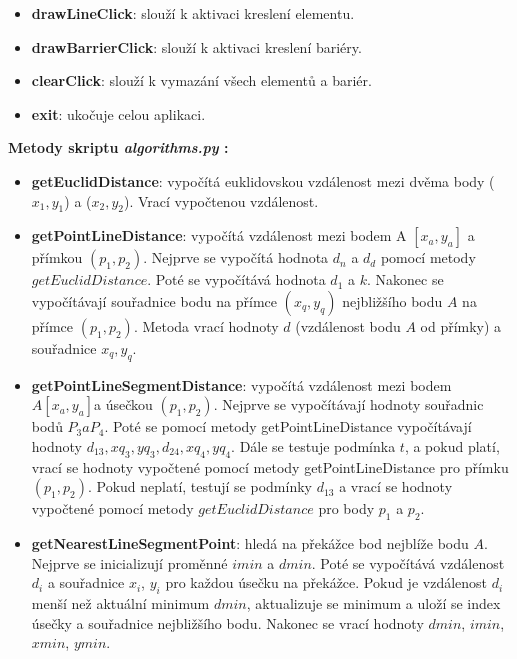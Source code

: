 \documentclass[a4paper,12pt]{article}
\begin{document}
{{{{{{\begin{itemize}
        \item \textbf{drawLineClick}: slouží k aktivaci kreslení elementu.

        \item \textbf{drawBarrierClick}: slouží k aktivaci kreslení bariéry.

        \item \textbf{clearClick}: slouží k vymazání všech elementů a bariér.

        \item \textbf{exit}: ukočuje celou aplikaci.
        
    \end{itemize}

    \textbf{Metody skriptu \emph{algorithms.py} :}
    \begin{itemize}
        \item \textbf{getEuclidDistance}: vypočítá euklidovskou vzdálenost mezi dvěma body ($x_1, y_1$) a ($x_2, y_2$). Vrací vypočtenou vzdálenost.

        \item \textbf{getPointLineDistance}: vypočítá vzdálenost mezi bodem A $[x_a, y_a]$ a přímkou $(p_1, p_2)$. Nejprve se vypočítá hodnota $d_n$ a $d_d$ pomocí metody $getEuclidDistance$. Poté se vypočítává hodnota $d_1$ a $k$. Nakonec se vypočítávají souřadnice bodu na přímce $(x_q, y_q)$ nejbližšího bodu $A$ na přímce $(p_1, p_2)$. Metoda vrací hodnoty $d$ (vzdálenost bodu $A$ od přímky) a souřadnice $x_q, y_q$.

        \item \textbf{getPointLineSegmentDistance}: vypočítá vzdálenost mezi bodem $A [x_a, y_a]$a úsečkou $(p_1, p_2)$. Nejprve se vypočítávají hodnoty souřadnic bodů $P_3 a P_4$. Poté se pomocí metody getPointLineDistance vypočítávají hodnoty $d_13, xq_3, yq_3, d_24, xq_4, yq_4$. Dále se testuje podmínka $t$, a pokud platí, vrací se hodnoty vypočtené pomocí metody getPointLineDistance pro přímku $(p_1, p_2)$. Pokud neplatí, testují se podmínky $d_13$ a vrací se hodnoty vypočtené pomocí metody $getEuclidDistance$ pro body $p_1$ a $p_2$.
        
        \item \textbf{getNearestLineSegmentPoint}: hledá na překážce bod nejblíže bodu $A$. Nejprve se inicializují proměnné $imin$ a $dmin$. Poté se vypočítává vzdálenost $d_i$ a souřadnice $x_i$, $y_i$ pro každou úsečku na překážce. Pokud je vzdálenost $d_i$ menší než aktuální minimum $dmin$, aktualizuje se minimum a uloží se index úsečky a souřadnice nejbližšího bodu. Nakonec se vrací hodnoty $dmin$, $imin$, $xmin$, $ymin$.


\end{itemize}}}}}}}
\end{document}
